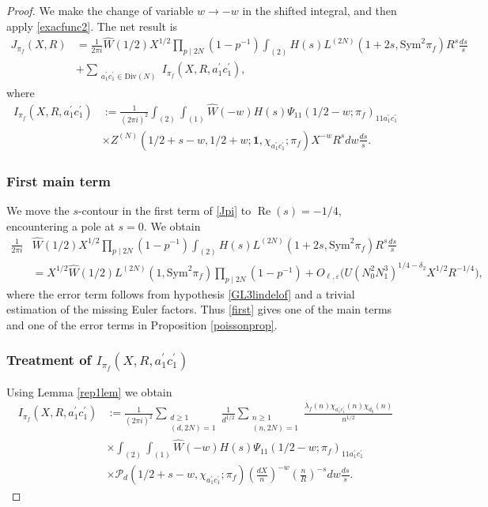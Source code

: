 \documentclass[12pt,reqno]{amsart}
\theoremstyle{plain}
\theoremstyle{remark}
\renewcommand{\Re}{\operatorname{Re}}
\numberwithin{equation}{section}
\numberwithin{lemma}{section}
\numberwithin{theorem}{section}
\numberwithin{prop}{section}
\numberwithin{remark}{section}
\begin{document}
\begin{proof}
We make the change of variable $w \rightarrow -w$ in the shifted integral, 
and then apply \eqref{exacfunc2}. The net result is
\begin{align} \label{Jpi}
J_{\pi_f}(X,R)&=\frac{1}{2 \pi i}  \widehat{W}(1/2) X^{1/2} 
\prod_{p \mid 2N} (1-p^{-1})
 \int_{(2)}H(s) L^{(2N)}(1+2s,\text{Sym}^2 \pi_f) R^{s} \frac{ds}{s} \nonumber \\
&+ \sum_{\substack{a_1^{\prime} c_1^{\prime} \in \text{Div}(N) }}
 I_{\pi_f}(X,R,a^{\prime}_1 c^{\prime}_1),
\end{align}
where 
\begin{align*}
I_{\pi_f}(X,R,a^{\prime}_1 c^{\prime}_1)&:=\frac{1}{(2 \pi i)^2} \int_{(2)} \int_{(1)} 
\widehat{W}(-w) H(s) \Psi_{11}(1/2-w;\pi_f)_{11a_1^{\prime}  c_1^{\prime}}  \nonumber  \\
& \times Z^{(N)}(1/2+s-w,1/2+w;\mathbf{1},\chi_{a_1^{\prime} c_1^{\prime}};\pi_f) 
X^{-w} R^{s} dw \frac{ds}{s}.
\end{align*}

\subsubsection{First main term}
We move the $s$-contour in the first term of \eqref{Jpi} to $\Re(s)=-1/4$, 
encountering a pole at $s=0$.
We obtain 
\begin{align} \label{first}
\frac{1}{2 \pi i} &  \widehat{W}(1/2) X^{1/2} \prod_{p \mid 2N} (1-p^{-1}) \int_{(2)}H(s) 
L^{(2N)}(1+2s,\text{Sym}^2 \pi_f) R^{s} \frac{ds}{s} \nonumber \\
&=X^{1/2}  \widehat{W}(1/2) L^{(2N)}(1,\text{Sym}^2 \pi_f) \prod_{p \mid 2N} (1-p^{-1}) 
+O_{\ell,\varepsilon} \big( U (N_0^2 N_1^3)^{1/4-\delta_2} X^{1/2} R^{-1/4} \big),
\end{align}
where the error term follows from hypothesis \eqref{GL3lindelof} and a trivial estimation
of the missing Euler factors.
Thus \eqref{first} gives one of the main terms and one of the error terms 
in Proposition \ref{poissonprop}.
\subsubsection{Treatment of $I_{\pi_f}(X,R,a^{\prime}_1 c^{\prime}_1)$}
Using Lemma \ref{rep1lem} we obtain
\begin{align} \label{Ipiint}
I_{\pi_f}(X,R,a^{\prime}_1 c^{\prime}_1)&:=\frac{1}{(2 \pi i)^2}   
 \sum_{\substack{d \geq 1 \\ (d,2N)=1}}  \frac{1}{d^{1/2}}
\sum_{\substack{n \geq 1 \\ (n,2N)=1}} \frac{\lambda_f(n) \chi_{a_1^{\prime} c_1^{\prime}}(n) 
 \chi_{d_0}(n) }{n^{1/2}}  \nonumber \\  
 & \times \int_{(2)} \int_{(1)} \widehat{W}(-w) H(s) 
  \Psi_{11}(1/2-w;\pi_f)_{11a_1^{\prime} c_1^{\prime}} \nonumber  \\
 & \times \mathcal{P}_d(1/2+s-w,\chi_{a_1^{\prime} c_1^{\prime}};\pi_f)  
 \left( \frac{dX}{n} \right)^{-w} \left( \frac{n}{R} \right)^{-s}     
 dw  \frac{ds}{s}.
\end{align}


\end{proof}
\end{document}
